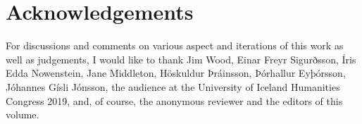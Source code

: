 \documentclass[output=paper,colorlinks,citecolor=brown,
]{langscibook}
\begin{document}
\section*{Acknowledgements}
For discussions and comments on various aspect and iterations of this work as well as judgements, I would like to thank Jim Wood, Einar Freyr Sigurðsson, Íris Edda Nowenstein, Jane Middleton, Höskuldur Þráinsson, Þórhallur Eyþórsson, Jóhannes Gísli Jónsson, the audience at the University of Iceland Humanities Congress 2019, and, of course, the anonymous reviewer and the editors of this volume.

\printbibliography[heading=subbibliography,notkeyword=this]
\end{document}
